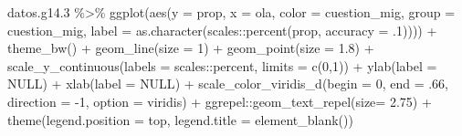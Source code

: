 \documentclass[
  12pt,
]{book}
\newenvironment{Shaded}{\begin{snugshade}}{\end{snugshade}}
\newcommand{\AttributeTok}[1]{\textcolor[rgb]{0.77,0.63,0.00}{#1}}
\newcommand{\ConstantTok}[1]{\textcolor[rgb]{0.00,0.00,0.00}{#1}}
\newcommand{\DecValTok}[1]{\textcolor[rgb]{0.00,0.00,0.81}{#1}}
\newcommand{\FloatTok}[1]{\textcolor[rgb]{0.00,0.00,0.81}{#1}}
\newcommand{\FunctionTok}[1]{\textcolor[rgb]{0.00,0.00,0.00}{#1}}
\newcommand{\NormalTok}[1]{#1}
\newcommand{\SpecialCharTok}[1]{\textcolor[rgb]{0.00,0.00,0.00}{#1}}
\newcommand{\StringTok}[1]{\textcolor[rgb]{0.31,0.60,0.02}{#1}}
\begin{document}
\begin{Shaded}
\begin{Highlighting}[]
\NormalTok{datos.g14}\FloatTok{.3} \SpecialCharTok{\%\textgreater{}\%} 
  \FunctionTok{ggplot}\NormalTok{(}\FunctionTok{aes}\NormalTok{(}\AttributeTok{y =}\NormalTok{ prop, }\AttributeTok{x =}\NormalTok{ ola, }\AttributeTok{color =}\NormalTok{ cuestion\_mig, }\AttributeTok{group =}\NormalTok{ cuestion\_mig,}
                          \AttributeTok{label =} \FunctionTok{as.character}\NormalTok{(scales}\SpecialCharTok{::}\FunctionTok{percent}\NormalTok{(prop, }\AttributeTok{accuracy =}\NormalTok{ .}\DecValTok{1}\NormalTok{)))) }\SpecialCharTok{+}
  \FunctionTok{theme\_bw}\NormalTok{() }\SpecialCharTok{+}   
  \FunctionTok{geom\_line}\NormalTok{(}\AttributeTok{size =} \DecValTok{1}\NormalTok{) }\SpecialCharTok{+}
  \FunctionTok{geom\_point}\NormalTok{(}\AttributeTok{size =} \FloatTok{1.8}\NormalTok{) }\SpecialCharTok{+}
  \FunctionTok{scale\_y\_continuous}\NormalTok{(}\AttributeTok{labels =}\NormalTok{ scales}\SpecialCharTok{::}\NormalTok{percent,}
                     \AttributeTok{limits =} \FunctionTok{c}\NormalTok{(}\DecValTok{0}\NormalTok{,}\DecValTok{1}\NormalTok{)) }\SpecialCharTok{+}
  \FunctionTok{ylab}\NormalTok{(}\AttributeTok{label =} \ConstantTok{NULL}\NormalTok{) }\SpecialCharTok{+}
  \FunctionTok{xlab}\NormalTok{(}\AttributeTok{label =} \ConstantTok{NULL}\NormalTok{) }\SpecialCharTok{+}
  \FunctionTok{scale\_color\_viridis\_d}\NormalTok{(}\AttributeTok{begin =} \DecValTok{0}\NormalTok{, }\AttributeTok{end =}\NormalTok{ .}\DecValTok{66}\NormalTok{, }\AttributeTok{direction =} \SpecialCharTok{{-}}\DecValTok{1}\NormalTok{, }\AttributeTok{option =} \StringTok{\textquotesingle{}viridis\textquotesingle{}}\NormalTok{) }\SpecialCharTok{+}
\NormalTok{  ggrepel}\SpecialCharTok{::}\FunctionTok{geom\_text\_repel}\NormalTok{(}\AttributeTok{size=} \FloatTok{2.75}\NormalTok{) }\SpecialCharTok{+}
  \FunctionTok{theme}\NormalTok{(}\AttributeTok{legend.position =} \StringTok{\textquotesingle{}top\textquotesingle{}}\NormalTok{,}
        \AttributeTok{legend.title =} \FunctionTok{element\_blank}\NormalTok{())}
\end{Highlighting}
\end{Shaded}
\end{document}
